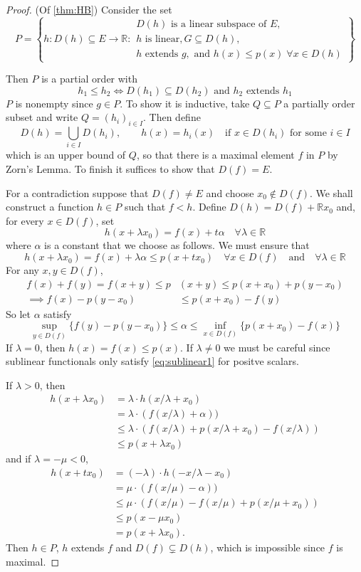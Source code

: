 \documentclass{article}
\theoremstyle{definition}
\numberwithin{equation}{section}
\newcommand{\R}{\mathbb{R}}
\begin{document}
\begin{proof} (Of \cref{thm:HB})
	Consider the set
	\[P=\left\{h:D(h)\subseteq E\to\R:\substack{D(h)\text{ is a linear subspace of }E,\\
	h\text{ is linear},G\subseteq D(h),\\
	h\text{ extends }g,\text{ and }h(x)\leq p(x)\;\forall x\in D(h)
	}\right\}\]

Then $P$ is a partial order with
\[h_1\leq h_2\iff D(h_1)\subseteq D(h_2)\text{ and }h_2\text{ extends }h_1\]
$P$ is nonempty since $g\in P$. To show it is inductive, take $Q\subseteq P$ a partially order subset and write $Q=(h_i)_{i\in I}$. Then define
\[D(h)=\bigcup_{i\in I}D(h_i),\qquad h(x)=h_i(x)\quad\text{if }x\in D(h_i) \text{ for some }i\in I\]
which is an upper bound of $Q$, so that there is a maximal element $f$ in $P$ by Zorn's Lemma. To finish it suffices to show that $D(f)=E$.

For a contradiction suppose that $D(f)\neq E$ and choose $x_0\notin D(f)$. We shall construct a function $h\in P$ such that $f<h$. Define $D(h)=D(f)+\R x_0$ and, for every $x\in D(f)$, set
 \[h(x+\lambda x_0)=f(x)+t\alpha\quad \forall \lambda\in\R\]
 where $\alpha$ is a constant that we choose as follows. We must ensure that
\[h(x+\lambda x_0)=f(x)+\lambda\alpha\leq p(x+tx_0)\quad\forall x\in D(f)\quad\text{and}\quad\forall \lambda\in\R\]
For any $x,y\in D(f)$,
\begin{align*}
	f(x)+f(y)=f(x+y)\leq p&(x+y)\leq p(x+x_0)+p(y-x_0)\\
	\implies f(x)-p(y-x_0)&\leq p(x+x_0)-f(y)
\end{align*}
So let $\alpha$ satisfy
\[\sup_{y\in D(f)}\{f(y)-p(y-x_0)\}\leq\alpha\leq\inf_{x\in D(f)}\{p(x+x_0)-f(x)\}\]
If $\lambda =0$, then $h(x)=f(x)\leq p(x)$. If $\lambda\neq0$ we must be careful since sublinear functionals only satisfy \cref{eq:sublinear1} for positve scalars.

If $\lambda >0$, then 
\begin{align*}
	h(x+\lambda x_0)&=\lambda\cdot h(x/\lambda+x_0)\\
	&=\lambda\cdot(f(x/\lambda)+\alpha))\\
	&\leq \lambda\cdot(f(x/\lambda)+p(x/\lambda+x_0)-f(x/\lambda))\\
	&\leq p(x+\lambda x_0)
\end{align*}
and if $\lambda=-\mu<0$,
\begin{align*}
	h(x+tx_0)&=(-\lambda)\cdot h(-x/\lambda-x_0)\\
	&=\mu\cdot(f(x/\mu)-\alpha))\\
	&\leq \mu\cdot(f(x/\mu)-f(x/\mu)+p(x/\mu+x_0))\\
	&\leq p(x-\mu x_0)\\
	&=p(x+\lambda x_0).
\end{align*}
Then $h\in P$, $h$ extends $f$ and $D(f)\subsetneq D(h)$, which is impossible since $f$ is maximal.
\end{proof}
\end{document}
